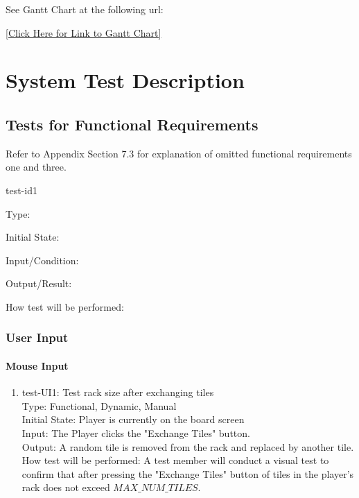\documentclass[12pt, titlepage]{article}
\begin{document}
See Gantt Chart at the following url:

\href{https://gitlab.cas.mcmaster.ca/choudhrk/thetrifecta_scrabble/blob/master/ProjectSchedule/3XA3\%20Gantt\%20Chart.pdf}{[Click Here for Link to Gantt Chart]}

\section{System Test Description}
	
\subsection{Tests for Functional Requirements} 
Refer to Appendix Section 7.3 for explanation of omitted functional requirements one and three. 
\item{test-id1\\}

Type: 
					
Initial State: 
					
Input/Condition: 
					
Output/Result: 
					
How test will be performed: 


\subsubsection{User Input}

\paragraph{Mouse Input}

\begin{enumerate}
\item{test-UI1: Test rack size after exchanging tiles \\} %
    Type: Functional, Dynamic, Manual\\
    Initial State: Player is currently on the board screen\\
    Input: The Player clicks the "Exchange Tiles" button.\\
    Output: A random tile is removed from the rack and replaced by another tile.\\
    How test will be performed: A test member will conduct a visual test to confirm that after pressing the "Exchange Tiles" button of tiles in the player's rack does not exceed $MAX\_NUM\_TILES$.

\end{enumerate}
\end{document}
